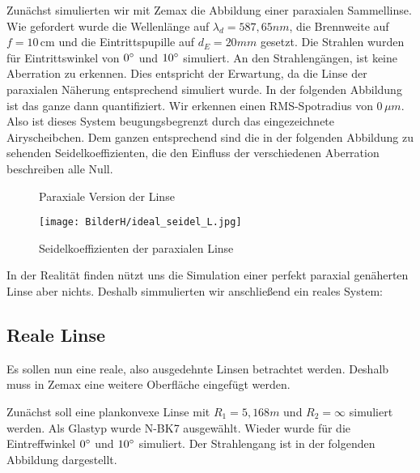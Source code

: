 \documentclass[twoside,colorback,accentcolor=tud4c,11pt]{tudreport}
\begin{document}
		Zunächst simulierten wir mit Zemax die Abbildung einer paraxialen Sammellinse. Wie gefordert wurde die Wellenlänge auf $\lambda_d = 587,65 nm$, die Brennweite auf $f = 10 \, \text{cm}$ und die Eintrittspupille auf $d_E = 20 mm$ gesetzt. Die Strahlen wurden für Eintrittswinkel von $0\degree$ und $10\degree$ simuliert. An den Strahlengängen, ist keine Aberration zu erkennen. Dies entspricht der Erwartung, da die Linse der paraxialen Näherung entsprechend simuliert wurde. In der folgenden Abbildung ist das ganze dann quantifiziert. Wir erkennen einen RMS-Spotradius von $0 \, \mu m$. Also ist dieses System beugungsbegrenzt durch das eingezeichnete Airyscheibchen. Dem ganzen entsprechend sind die in der folgenden Abbildung zu sehenden Seidelkoeffizienten, die den Einfluss der verschiedenen Aberration beschreiben alle Null. 
		
	\begin{figure}[H]
\centering
  \quad
  \quad   
  \caption{Paraxiale Version der Linse}
\end{figure}		
		
\begin{figure}[H]
\centering
   	\begin{minipage}[b]{\textwidth}
 \centering  	\texttt{[image: BilderH/ideal\_seidel\_L.jpg]}
   	\caption{Seidelkoeffizienten der paraxialen Linse}
  	\end{minipage}
\end{figure}		
		
		In der Realität finden nützt uns die Simulation einer perfekt paraxial genäherten Linse aber nichts. Deshalb simmulierten wir anschließend ein reales System:
		
		\subsection{Reale Linse}
		
		Es sollen nun eine reale, also ausgedehnte Linsen betrachtet werden. Deshalb muss in Zemax eine weitere Oberfläche eingefügt werden. 
		
		Zunächst soll eine plankonvexe Linse mit $R_1 = 5,168 m$ und $R_2 = \infty$ simuliert werden. Als Glastyp wurde N-BK7 ausgewählt. Wieder wurde für die Eintreffwinkel $0\degree$ und $10\degree$ simuliert. Der Strahlengang ist in der folgenden Abbildung dargestellt.
		
\end{document}
